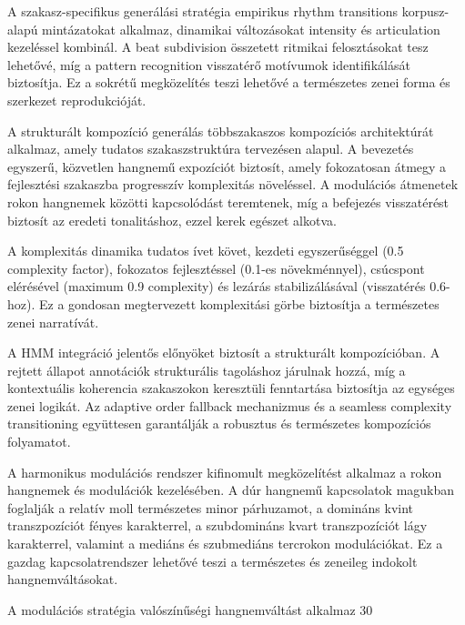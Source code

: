 A szakasz-specifikus generálási stratégia empirikus rhythm transitions korpusz-alapú mintázatokat alkalmaz, dinamikai változásokat intensity és articulation kezeléssel kombinál. A beat subdivision összetett ritmikai felosztásokat tesz lehetővé, míg a pattern recognition visszatérő motívumok identifikálását biztosítja. Ez a sokrétű megközelítés teszi lehetővé a természetes zenei forma és szerkezet reprodukcióját.

A strukturált kompozíció generálás többszakaszos kompozíciós architektúrát alkalmaz, amely tudatos szakaszstruktúra tervezésen alapul. A bevezetés egyszerű, közvetlen hangnemű expozíciót biztosít, amely fokozatosan átmegy a fejlesztési szakaszba progresszív komplexitás növeléssel. A modulációs átmenetek rokon hangnemek közötti kapcsolódást teremtenek, míg a befejezés visszatérést biztosít az eredeti tonalitáshoz, ezzel kerek egészet alkotva.

A komplexitás dinamika tudatos ívet követ, kezdeti egyszerűséggel (0.5 complexity factor), fokozatos fejlesztéssel (0.1-es növekménnyel), csúcspont elérésével (maximum 0.9 complexity) és lezárás stabilizálásával (visszatérés 0.6-hoz). Ez a gondosan megtervezett komplexitási görbe biztosítja a természetes zenei narratívát.

A HMM integráció jelentős előnyöket biztosít a strukturált kompozícióban. A rejtett állapot annotációk strukturális tagoláshoz járulnak hozzá, míg a kontextuális koherencia szakaszokon keresztüli fenntartása biztosítja az egységes zenei logikát. Az adaptive order fallback mechanizmus és a seamless complexity transitioning együttesen garantálják a robusztus és természetes kompozíciós folyamatot.

A harmonikus modulációs rendszer kifinomult megközelítést alkalmaz a rokon hangnemek és modulációk kezelésében. A dúr hangnemű kapcsolatok magukban foglalják a relatív moll természetes minor párhuzamot, a domináns kvint transzpozíciót fényes karakterrel, a szubdomináns kvart transzpozíciót lágy karakterrel, valamint a mediáns és szubmediáns tercrokon modulációkat. Ez a gazdag kapcsolatrendszer lehetővé teszi a természetes és zeneileg indokolt hangnemváltásokat.

A modulációs stratégia valószínűségi hangnemváltást alkalmaz 30%

